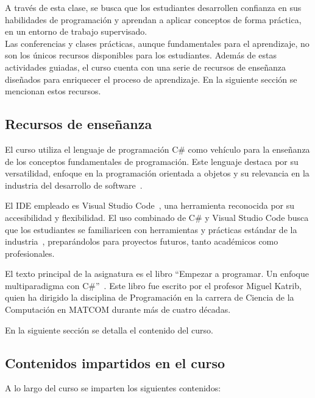 A través de esta clase, se busca que los estudiantes desarrollen confianza en sus habilidades de programación y aprendan a aplicar conceptos de forma práctica, en un entorno de trabajo supervisado.\\

Las conferencias y clases prácticas, aunque fundamentales para el aprendizaje, no son los únicos recursos disponibles para los estudiantes. Además de estas actividades guiadas, el curso cuenta con una serie de recursos de enseñanza diseñados para enriquecer el proceso de aprendizaje. En la siguiente sección se mencionan estos recursos.

\subsection{Recursos de enseñanza}

El curso utiliza el lenguaje de programación C\# como vehículo para la enseñanza de los conceptos fundamentales de programación. Este lenguaje destaca por su versatilidad, enfoque en la programación orientada a objetos y su relevancia en la industria del desarrollo de software~\cite{microsoft-docs, Albahari2017, Troelsen2021}.

El IDE empleado es Visual Studio Code~\cite{vscode}, una herramienta reconocida por su accesibilidad y flexibilidad. El uso combinado de C\# y Visual Studio Code busca que los estudiantes se familiaricen con herramientas y prácticas estándar de la industria~\cite{microsoft-docs}, preparándolos para proyectos futuros, tanto académicos como profesionales.

El texto principal de la asignatura es el libro ``Empezar a programar. Un enfoque multiparadigma con C\#''~\cite{katrib_programar}. Este libro fue escrito por el profesor Miguel Katrib, quien ha dirigido la disciplina de Programación en la carrera de Ciencia de la Computación en \mbox{MATCOM} durante más de cuatro décadas.

En la siguiente sección se detalla el contenido del curso.

\subsection{Contenidos impartidos en el curso}  

A lo largo del curso se imparten los siguientes contenidos:

